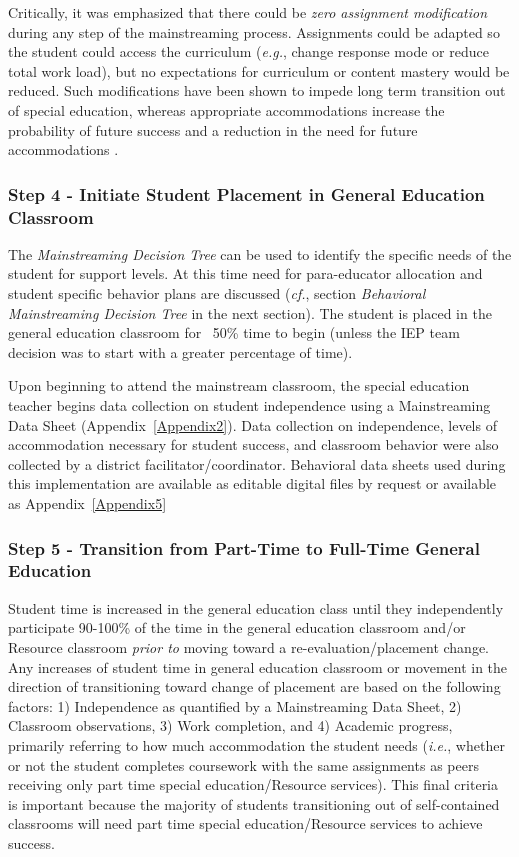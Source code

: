 \documentclass[twoside]{article}
\begin{document}
Critically, it was emphasized that there could be \textit{zero assignment modification} during any step of the mainstreaming process. Assignments could be adapted so the student could access the curriculum (\textit{e.g.}, change response mode or reduce total work load), but no expectations for curriculum or content mastery would be reduced. Such modifications have been shown to impede long term transition out of special education, whereas appropriate accommodations increase the probability of future success and a reduction in the need for future accommodations \parencite{fisher2003special,fuchs2003responsiveness,hollenbeck1998teachers}.

\subsubsection{Step 4 - Initiate Student Placement in General Education Classroom}
The \textit{Mainstreaming Decision Tree} can be used to identify the specific needs of the student for support levels. At this time need for para-educator allocation and student specific behavior plans are discussed (\textit{cf.}, section \textit{Behavioral Mainstreaming Decision Tree} in the next section). The student is placed in the general education classroom for ~50\% time to begin (unless the IEP team decision was to start with a greater percentage of time).

Upon beginning to attend the mainstream classroom, the special education teacher begins data collection on student independence using a Mainstreaming Data Sheet (Appendix~\ref{Appendix2}). Data collection on independence, levels of accommodation necessary for student success, and classroom behavior were also collected by a district facilitator/coordinator. Behavioral data sheets used during this implementation are available as editable digital files by request or available as Appendix~\ref{Appendix5}

\subsubsection{Step 5 - Transition from Part-Time to Full-Time General Education}
Student time is increased in the general education class until they independently participate 90-100\% of the time in the general education classroom and/or Resource classroom \textit{prior to} moving toward a re-evaluation/placement change. Any increases of student time in general education classroom or movement in the direction of transitioning toward change of placement are based on the following factors: 1) Independence as quantified by a Mainstreaming Data Sheet, 2) Classroom observations, 3) Work completion, and 4) Academic progress, primarily referring to how much accommodation the student needs (\textit{i.e.}, whether or not the student completes coursework with the same assignments as peers receiving only part time special education/Resource services). This final criteria is important because the majority of students transitioning out of self-contained classrooms will need part time special education/Resource services to achieve success.
\end{document}
